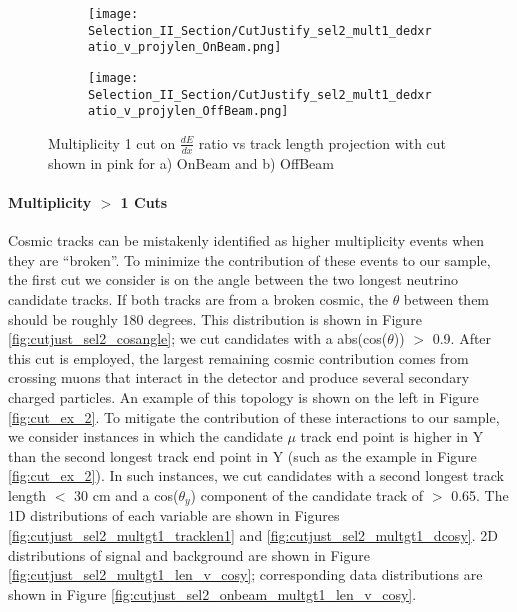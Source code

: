 \begin{figure}[H]
\centering
\begin{subfigure}[t]{0.25\textwidth}
  \centering
  \texttt{[image: Selection\_II\_Section/CutJustify\_sel2\_mult1\_dedxratio\_v\_projylen\_OnBeam.png]}  
  \caption{ }
  \end{subfigure} 
  \hspace{1 mm}
  \begin{subfigure}[t]{0.25\textwidth}
    \centering
\texttt{[image: Selection\_II\_Section/CutJustify\_sel2\_mult1\_dedxratio\_v\_projylen\_OffBeam.png]}
  \caption{ }
  \end{subfigure} 
\caption{Multiplicity 1 cut on $\frac{dE}{dx}$ ratio vs track length projection with cut shown in pink for a) OnBeam and b) OffBeam }
\label{fig:cutjust_sel2_onbeam_mult1_dedxratio_v_leny}

\end{figure}

\clearpage
\paragraph{Multiplicity $>$ 1 Cuts}
Cosmic tracks can be mistakenly identified as higher multiplicity events when they are ``broken''. To minimize the contribution of these events to our sample, the first cut we consider is on the angle between the two longest neutrino candidate tracks. If both tracks are from a broken cosmic, the $\theta$ between them should be roughly 180 degrees.  This distribution is shown in Figure \ref{fig:cutjust_sel2_cosangle}; we cut candidates with a abs(cos($\theta$)) $>$ 0.9.  After this cut is employed, the largest remaining cosmic contribution comes from crossing muons that interact in the detector and produce several secondary charged particles. An example of this topology is shown on the left in Figure \ref{fig:cut_ex_2}.  To mitigate the contribution of these interactions to our sample, we consider instances in which the candidate $\mu$ track end point is higher in Y than the second longest track end point in Y (such as the example in Figure \ref{fig:cut_ex_2}).  In such instances, we cut candidates with a second longest track length $<$ 30 cm and a cos($\theta_y$) component of the candidate track of $>$ 0.65. The 1D distributions of each variable are shown in Figures \ref{fig:cutjust_sel2_multgt1_tracklen1} and \ref{fig:cutjust_sel2_multgt1_dcosy}.  2D distributions of signal and background are shown in Figure \ref{fig:cutjust_sel2_multgt1_len_v_cosy}; corresponding data distributions are shown in Figure \ref{fig:cutjust_sel2_onbeam_multgt1_len_v_cosy}. 

